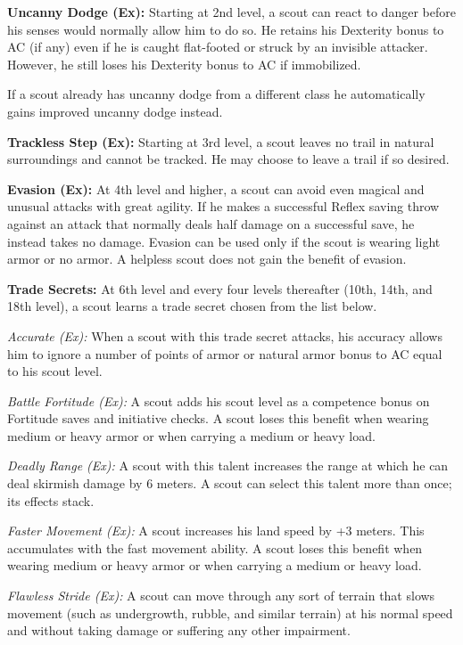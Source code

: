 \textbf{Uncanny Dodge (Ex):} Starting at 2nd level, a scout can react to danger before his senses would normally allow him to do so. He retains his Dexterity bonus to AC (if any) even if he is caught flat-footed or struck by an invisible attacker. However, he still loses his Dexterity bonus to AC if immobilized.

If a scout already has uncanny dodge from a different class he automatically gains improved uncanny dodge instead.


\textbf{Trackless Step (Ex):} Starting at 3rd level, a scout leaves no trail in natural surroundings and cannot be tracked. He may choose to leave a trail if so desired.


\textbf{Evasion (Ex):} At 4th level and higher, a scout can avoid even magical and unusual attacks with great agility. If he makes a successful Reflex saving throw against an attack that normally deals half damage on a successful save, he instead takes no damage. Evasion can be used only if the scout is wearing light armor or no armor. A helpless scout does not gain the benefit of evasion.


\textbf{Trade Secrets:} At 6th level and every four levels thereafter (10th, 14th, and 18th level), a scout learns a trade secret chosen from the list below.

\textit{Accurate (Ex):} When a scout with this trade secret attacks, his accuracy allows him to ignore a number of points of armor or natural armor bonus to AC equal to \onequarter his scout level.

\textit{Battle Fortitude (Ex):} A scout adds \onequarter his scout level as a competence bonus on Fortitude saves and initiative checks. A scout loses this benefit when wearing medium or heavy armor or when carrying a medium or heavy load.

\textit{Deadly Range (Ex):} A scout with this talent increases the range at which he can deal skirmish damage by 6 meters. A scout can select this talent more than once; its effects stack.

\textit{Faster Movement (Ex):} A scout increases his land speed by +3 meters. This accumulates with the fast movement ability. A scout loses this benefit when wearing medium or heavy armor or when carrying a medium or heavy load.

\textit{Flawless Stride (Ex):} A scout can move through any sort of terrain that slows movement (such as undergrowth, rubble, and similar terrain) at his normal speed and without taking damage or suffering any other impairment.

